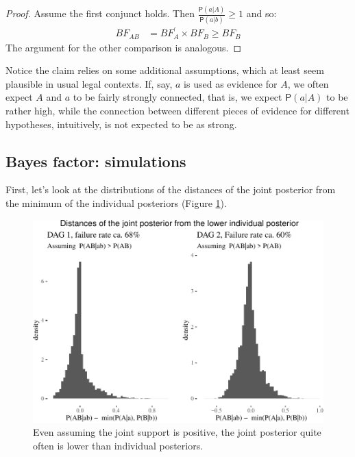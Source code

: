 \documentclass[
  10pt,
  dvipsnames,enabledeprecatedfontcommands]{scrartcl}
\newcommand{\pr}[1]{\ensuremath{\mathsf{P}(#1)}}
\begin{document}
\begin{proof}
Assume the first conjunct holds. Then $\frac{\pr{a\vert A}}{\pr{a\vert b}} \geq 1$ and so:
\begin{align*}
BF_{AB} &= BF^{'}_{A} \times BF_{B} \geq BF_{B}
\end{align*}
\noindent The argument for the other comparison is analogous.
\end{proof}

Notice the claim relies on some additional assumptions, which at least
seem plausible in usual legal contexts. If, say, \(a\) is used as
evidence for \(A\), we often expect \(A\) and \(a\) to be fairly
strongly connected, that is, we expect \(\pr{a\vert A}\) to be rather
high, while the connection between different pieces of evidence for
different hypotheses, intuitively, is not expected to be as strong.

\hypertarget{bayes-factor-simulations}{%
\subsection*{Bayes factor: simulations}\label{bayes-factor-simulations}}

First, let's look at the distributions of the distances of the joint
posterior from the minimum of the individual posteriors (Figure
\ref{fig:posteriorFailure}).

\begin{figure}[H]


\begin{center}\includegraphics[width=1\linewidth]{conjunction-appendix13_files/figure-latex/unnamed-chunk-12-1} \end{center}
\caption{Even assuming the joint support is positive, the joint posterior quite often is lower than individual posteriors.}
\label{fig:posteriorFailure}
\end{figure}
\end{document}
